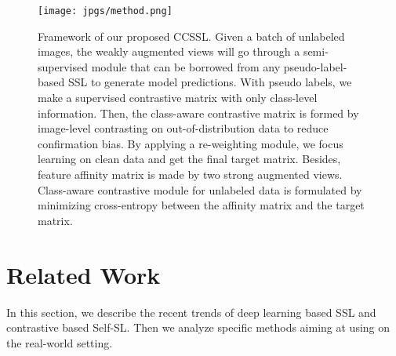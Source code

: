 \documentclass[10pt,twocolumn,letterpaper]{article}
\begin{document}
\begin{figure*}
    \centering
    \small
      \texttt{[image: jpgs/method.png]}
    \caption{Framework of our proposed CCSSL. Given a batch of unlabeled images, the weakly augmented views will go through a semi-supervised module that can be borrowed from any pseudo-label-based SSL to generate model predictions. With pseudo labels, we make a supervised contrastive matrix with only class-level information. Then, the class-aware contrastive matrix is formed by image-level contrasting on out-of-distribution data to reduce confirmation bias. By applying a re-weighting module, we focus learning on clean data and get the final target matrix. Besides, feature affinity matrix is made by two strong augmented views. Class-aware contrastive module for unlabeled data is formulated by minimizing cross-entropy between the affinity matrix and the target matrix.}
    \label{fig:method}
\end{figure*}

\section{Related Work}
\label{sec:related}
In this section, we describe the recent trends of deep learning based SSL and contrastive based Self-SL. Then we analyze specific methods aiming at using on the real-world setting. 
\end{document}
